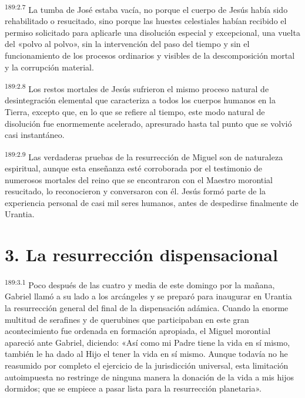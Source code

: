 \par 
\textsuperscript{189:2.7} La tumba de José estaba vacía, no porque el cuerpo de Jesús había sido rehabilitado o resucitado, sino porque las huestes celestiales habían recibido el permiso solicitado para aplicarle una disolución especial y excepcional, una vuelta del «polvo al polvo», sin la intervención del paso del tiempo y sin el funcionamiento de los procesos ordinarios y visibles de la descomposición mortal y la corrupción material.

\par 
\textsuperscript{189:2.8} Los restos mortales de Jesús sufrieron el mismo proceso natural de desintegración elemental que caracteriza a todos los cuerpos humanos en la Tierra, excepto que, en lo que se refiere al tiempo, este modo natural de disolución fue enormemente acelerado, apresurado hasta tal punto que se volvió casi instantáneo.

\par 
\textsuperscript{189:2.9} Las verdaderas pruebas de la resurrección de Miguel son de naturaleza espiritual, aunque esta enseñanza esté corroborada por el testimonio de numerosos mortales del reino que se encontraron con el Maestro morontial resucitado, lo reconocieron y conversaron con él. Jesús formó parte de la experiencia personal de casi mil seres humanos, antes de despedirse finalmente de Urantia.

\section*{3. La resurrección dispensacional}
\par 
\textsuperscript{189:3.1} Poco después de las cuatro y media de este domingo por la mañana, Gabriel llamó a su lado a los arcángeles y se preparó para inaugurar en Urantia la resurrección general del final de la dispensación adámica. Cuando la enorme multitud de serafines y de querubines que participaban en este gran acontecimiento fue ordenada en formación apropiada, el Miguel morontial apareció ante Gabriel, diciendo: «Así como mi Padre tiene la vida en sí mismo, también le ha dado al Hijo el tener la vida en sí mismo. Aunque todavía no he reasumido por completo el ejercicio de la jurisdicción universal, esta limitación autoimpuesta no restringe de ninguna manera la donación de la vida a mis hijos dormidos; que se empiece a pasar lista para la resurrección planetaria».

